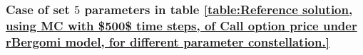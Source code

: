 \documentclass[11pt]{article}
\begin{document}



%





\subsubsection{Case of set $5$ parameters in table \ref{table:Reference solution, using MC with $500$ time steps, of Call option price under rBergomi model, for different parameter constellation.}}\label{sec:Case of set 5 parameters}
\end{document}
